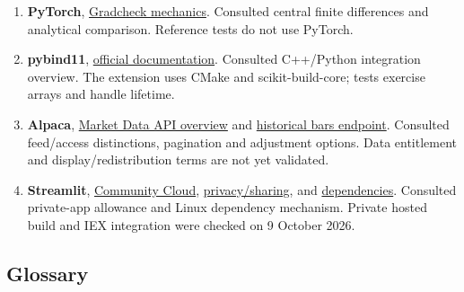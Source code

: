 \documentclass[
  american,
  11pt,
]{article}
\begin{document}
\begin{enumerate}
  \href{https://web.stanford.edu/~boyd/papers/pdf/prox_algs.pdf}{Author-hosted
  paper}. Consulted projected gradient as proximal gradient for a set
  indicator; project-specific capped-simplex derivation is provided in
  chapter 3.
\item
  \textbf{PyTorch},
  \href{https://docs.pytorch.org/docs/2.14/notes/gradcheck.html}{Gradcheck
  mechanics}. Consulted central finite differences and analytical
  comparison. Reference tests do not use PyTorch.
\item
  \textbf{pybind11},
  \href{https://pybind11.readthedocs.io/en/stable/}{official
  documentation}. Consulted C++/Python integration overview. The
  extension uses CMake and scikit-build-core; tests exercise arrays and
  handle lifetime.
\item
  \textbf{Alpaca},
  \href{https://docs.alpaca.markets/us/docs/about-market-data-api}{Market
  Data API overview} and
  \href{https://docs.alpaca.markets/us/reference/stockbars}{historical
  bars endpoint}. Consulted feed/access distinctions, pagination and
  adjustment options. Data entitlement and display/redistribution terms
  are not yet validated.
\item
  \textbf{Streamlit},
  \href{https://docs.streamlit.io/deploy/streamlit-community-cloud}{Community
  Cloud},
  \href{https://docs.streamlit.io/deploy/streamlit-community-cloud/share-your-app}{privacy/sharing},
  and
  \href{https://docs.streamlit.io/deploy/streamlit-community-cloud/deploy-your-app/app-dependencies}{dependencies}.
  Consulted private-app allowance and Linux dependency mechanism. Private
  hosted build and IEX integration were checked on 9 October 2026.
\end{enumerate}

\clearpage
\subsection{Glossary}\label{glossary}
\end{document}

